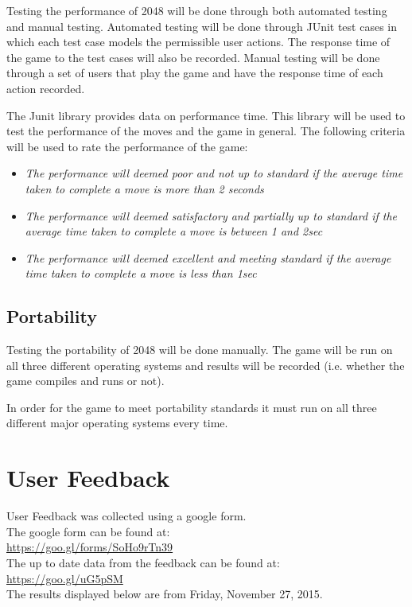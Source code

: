 \documentclass[12pt]{article}
\begin{document}
Testing the performance of 2048 will be done through both automated testing and manual testing. Automated testing will be done through JUnit test cases in which each test case models the permissible user actions. The response time of the game to the test cases will also be recorded. Manual testing will be done through a set of users that play the game and have the response time of each action recorded.
\par The Junit library provides data on performance time. This library will be used to test the performance of the moves and the game in general. The following criteria will be used to rate the performance of the game:
\begin{itemize}
\item\emph{The performance will deemed poor and not up to standard if the average time taken to complete a move is more than 2 seconds}
\item\emph{The performance will deemed satisfactory and partially up to standard if the average time taken to complete a move is between 1 and 2sec}
\item\emph{The performance will deemed excellent and meeting standard if the average time taken to complete a move is less than 1sec}

\end{itemize}

\subsection{Portability}

Testing the portability of 2048 will be done manually. The game will be run on all three different operating systems and results will be recorded (i.e. whether the game compiles and runs or not).
\par In order for the game to meet portability standards it must run on all three different major operating systems every time.

\section{User Feedback}
User Feedback was collected using a google form. \\
The google form can be found at: \\ \url{https://goo.gl/forms/SoHo9rTn39} \\
The up to date data from the feedback can be found at:\\ \url{https://goo.gl/uG5pSM} \\
The results displayed below are from Friday, November 27, 2015.
\end{document}
